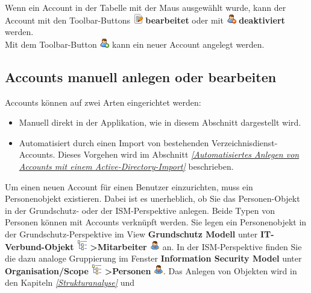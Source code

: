 \documentclass[a4paper,10pt]{book}
\begin{document}
Wenn ein Account in der Tabelle mit der Maus ausgewählt wurde, kann der Account mit den Toolbar-Buttons \includegraphics[height=2ex]{Icon/Edit.png} \textbf{bearbeitet} oder mit \includegraphics[height=2ex]{Icon/user_disabled.png} \textbf{deaktiviert} werden.
\newline\\
Mit dem Toolbar-Button \includegraphics[height=2ex]{Icon/user_add.png} kann ein neuer Account angelegt werden.

\subsection{Accounts manuell anlegen oder bearbeiten} \label{sec:accounts-anlegen}
Accounts können auf zwei Arten eingerichtet werden:
\begin{itemize}
\item Manuell direkt in der Applikation, wie in diesem Abschnitt dargestellt wird.
\item Automatisiert durch einen Import von bestehenden Verzeichnisdienst-Accounts. Dieses Vorgehen wird im Abschnitt
{\em \ref{Automatisiertes Anlegen von Accounts mit einem Active-Directory-Import} } beschrieben.
\end{itemize}
Um einen neuen Account für einen Benutzer einzurichten, muss ein Personenobjekt existieren. Dabei ist es unerheblich, ob Sie das Personen-Objekt in der Grundschutz- oder der ISM-Perspektive anlegen. Beide Typen von Personen können mit Accounts verknüpft werden. Sie legen ein Personenobjekt in der Grundschutz-Perspektive im View \textbf{Grundschutz Modell} unter \textbf{IT-Verbund-Objekt
\includegraphics[height=2ex]{Icon/GS_Modell.png} \textgreater Mitarbeiter \includegraphics[height=2ex]{Icon/Mitarbeiter.png}} an. In der
ISM-Perspektive finden Sie die dazu analoge Gruppierung im Fenster \textbf{Information Security Model} unter
\textbf{Organisation/Scope \includegraphics[height=2ex]{Icon/GS_Modell.png} \textgreater Personen} \includegraphics[height=2ex]{Icon/Mitarbeiter.png}. Das Anlegen von Objekten wird in den Kapiteln {\em \ref{Strukturanalyse} } und
\end{document}
